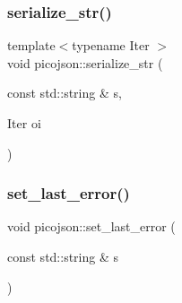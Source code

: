 \hypertarget{namespacepicojson_a11130e017d868857aeb016f5e3d29008}{}\label{namespacepicojson_a11130e017d868857aeb016f5e3d29008} 
\subsubsection{\texorpdfstring{serialize\+\_\+str()}{serialize\_str()}}
{\footnotesize\ttfamily template$<$typename Iter $>$ \\
void picojson\+::serialize\+\_\+str (\begin{DoxyParamCaption}\item[{const std\+::string \&}]{s,  }\item[{Iter}]{oi }\end{DoxyParamCaption})}

\hypertarget{namespacepicojson_a509585c918611015ec995d4374fee4c9}{}\label{namespacepicojson_a509585c918611015ec995d4374fee4c9} 
\subsubsection{\texorpdfstring{set\+\_\+last\+\_\+error()}{set\_last\_error()}}
{\footnotesize\ttfamily void picojson\+::set\+\_\+last\+\_\+error (\begin{DoxyParamCaption}\item[{const std\+::string \&}]{s }\end{DoxyParamCaption})\hspace{0.3cm}{\ttfamily [inline]}}

